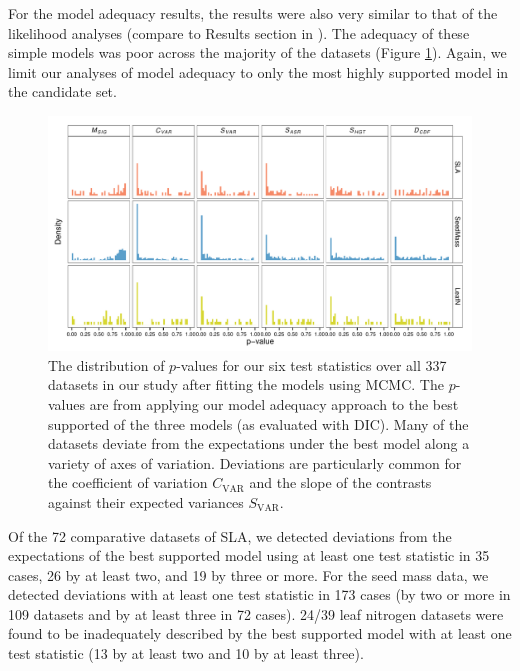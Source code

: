 For the model adequacy results, the results were also very similar to that of the likelihood analyses (compare to Results section in ). The adequacy of these simple models was poor across the majority of the datasets (Figure \ref{fig:supp-pvalues}). Again, we limit our analyses of model adequacy to only the most highly supported model in the candidate set.

\begin{figure}[p]
  \centering
  \includegraphics[angle=90, origin=c, scale=0.75]{figs/pval-hist-bayes}
  \caption[Distribution of $p$-values for test statistics (Bayesian)]{The distribution of $p$-values for our six test statistics over all 337 datasets in our study after fitting the models using MCMC. The $p$-values are from applying our model adequacy approach to the best supported of the three models (as evaluated with DIC). Many of the datasets deviate from the expectations under the best model along a variety of axes of variation. Deviations are particularly common for the coefficient of variation $C_{\text{VAR}}$ and the slope of the contrasts against their expected variances $S_{\text{VAR}}$.}
  \label{fig:supp-pvalues}
\end{figure}


Of the 72 comparative datasets of SLA, we detected deviations from the expectations of the best supported model using at least one test statistic in 35 cases, 26 by at least two, and 19 by three or more.
For the seed mass data, we detected deviations with at least one test statistic in 173 cases (by two or more in 109 datasets and by at least three in 72 cases).
24/39 leaf nitrogen datasets were found to be inadequately described by the best supported model with at least one test statistic (13 by at least two and 10 by at least three).


